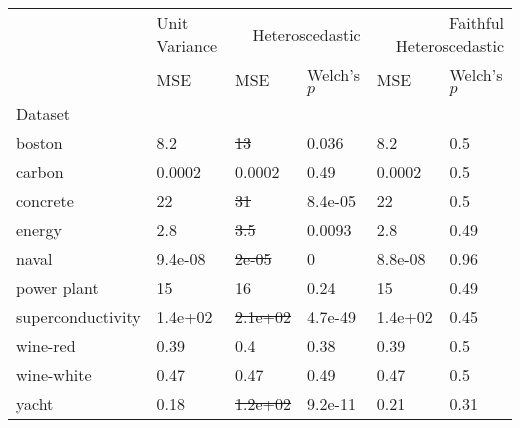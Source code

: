 \begin{tabular}{l|l|ll|ll}
\toprule
 & Unit Variance & \multicolumn{2}{r}{Heteroscedastic} & \multicolumn{2}{r}{Faithful Heteroscedastic} \\
 & MSE & MSE & Welch's $p$ & MSE & Welch's $p$ \\
Dataset &  &  &  &  &  \\
\midrule
boston & 8.2 & \sout{13} & 0.036 & 8.2 & 0.5 \\
carbon & 0.0002 & 0.0002 & 0.49 & 0.0002 & 0.5 \\
concrete & 22 & \sout{31} & 8.4e-05 & 22 & 0.5 \\
energy & 2.8 & \sout{3.5} & 0.0093 & 2.8 & 0.49 \\
naval & 9.4e-08 & \sout{2e-05} & 0 & 8.8e-08 & 0.96 \\
power plant & 15 & 16 & 0.24 & 15 & 0.49 \\
superconductivity & 1.4e+02 & \sout{2.1e+02} & 4.7e-49 & 1.4e+02 & 0.45 \\
wine-red & 0.39 & 0.4 & 0.38 & 0.39 & 0.5 \\
wine-white & 0.47 & 0.47 & 0.49 & 0.47 & 0.5 \\
yacht & 0.18 & \sout{1.2e+02} & 9.2e-11 & 0.21 & 0.31 \\
\bottomrule
\end{tabular}
